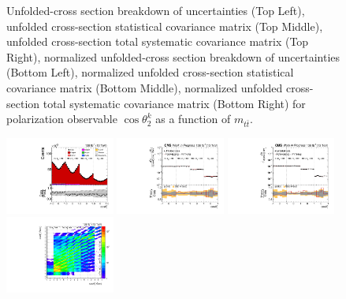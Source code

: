 \begin{refsection}
\begin{figure}[htb]
\begin{center}
\caption{Unfolded-cross section breakdown of uncertainties (Top Left), unfolded cross-section statistical covariance matrix (Top Middle), unfolded cross-section total systematic covariance matrix (Top Right), normalized unfolded-cross section breakdown of uncertainties (Bottom Left), normalized unfolded cross-section statistical covariance matrix (Bottom Middle), normalized unfolded cross-section total systematic covariance matrix (Bottom Right) for polarization observable $\cos\theta_{2}^{k}$ as a function of $m_{t\bar{t}}$.}
\label{fig:b2k_mttbar_uncertainties}
\end{center}
\end{figure}
\clearpage
\begin{figure}[htb]
\begin{center}
 \includegraphics[width=0.32\textwidth]{fig_fullRun2UL/controlplots/combined/Hyp_AntiLeptonBn_vs_TTBarMass.pdf}
 \includegraphics[width=0.32\textwidth]{fig_fullRun2UL/unfolding/combined/UnfoldedResults_b1n_mttbar.pdf}
 \includegraphics[width=0.32\textwidth]{fig_fullRun2UL/unfolding/combined/UnfoldedResultsNorm_b1n_mttbar.pdf} \\
 \includegraphics[width=0.32\textwidth]{fig_fullRun2UL/unfolding/combined/ResponseMatrix_b1n_mttbar.pdf}

\end{center}
\end{figure}
\end{refsection}
